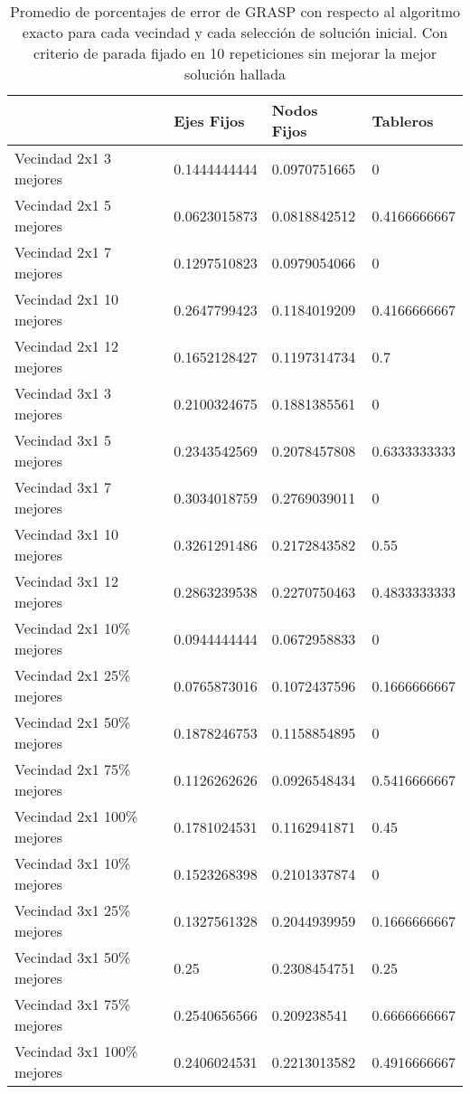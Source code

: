 \begin{table}[h!]
	\begin{tabular}[c]{|l|l|l|l|}
	\hline  & Ejes Fijos & Nodos Fijos & Tableros \\
	\hline Vecindad 2x1 3 mejores & 0.1444444444 & 0.0970751665 & 0 \\
	\hline Vecindad 2x1 5 mejores & 0.0623015873 & 0.0818842512 & 0.4166666667 \\
	\hline Vecindad 2x1 7 mejores & 0.1297510823 & 0.0979054066 & 0 \\
	\hline Vecindad 2x1 10 mejores & 0.2647799423 & 0.1184019209 & 0.4166666667 \\
	\hline Vecindad 2x1 12 mejores & 0.1652128427 & 0.1197314734 & 0.7 \\
	\hline Vecindad 3x1 3 mejores & 0.2100324675 & 0.1881385561 & 0 \\
	\hline Vecindad 3x1 5 mejores & 0.2343542569 & 0.2078457808 & 0.6333333333 \\
	\hline Vecindad 3x1 7 mejores & 0.3034018759 & 0.2769039011 & 0 \\
	\hline Vecindad 3x1 10 mejores & 0.3261291486 & 0.2172843582 & 0.55 \\
	\hline Vecindad 3x1 12 mejores & 0.2863239538 & 0.2270750463 & 0.4833333333 \\
	\hline Vecindad 2x1 10\% mejores  & 0.0944444444 & 0.0672958833 & 0 \\
	\hline Vecindad 2x1 25\% mejores & 0.0765873016 & 0.1072437596 & 0.1666666667 \\
	\hline Vecindad 2x1 50\% mejores & 0.1878246753 & 0.1158854895 & 0 \\
	\hline Vecindad 2x1 75\% mejores & 0.1126262626 & 0.0926548434 & 0.5416666667 \\
	\hline Vecindad 2x1 100\% mejores & 0.1781024531 & 0.1162941871 & 0.45 \\
	\hline Vecindad 3x1 10\% mejores  & 0.1523268398 & 0.2101337874 & 0 \\
	\hline Vecindad 3x1 25\% mejores & 0.1327561328 & 0.2044939959 & 0.1666666667 \\
	\hline Vecindad 3x1 50\% mejores & 0.25 & 0.2308454751 & 0.25 \\
	\hline Vecindad 3x1 75\% mejores & 0.2540656566 & 0.209238541 & 0.6666666667 \\
	\hline Vecindad 3x1 100\% mejores & 0.2406024531 & 0.2213013582 & 0.4916666667 \\
	\hline
	\end{tabular}
\caption{Promedio de porcentajes de error de GRASP con respecto al algoritmo exacto para cada vecindad y cada selecci\'on de soluci\'on inicial. Con criterio de parada fijado en 10 repeticiones sin mejorar la mejor soluci\'on hallada}
\end{table}

